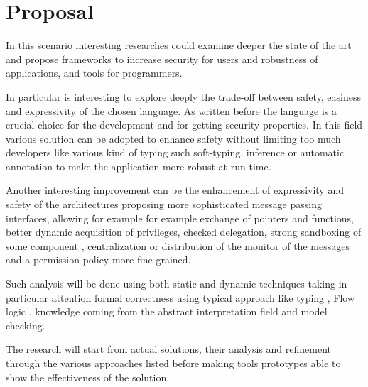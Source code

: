 \documentclass[10pt,a4paper,draft]{article}
\begin{document}
\section*{Proposal}
In this scenario interesting researches could examine deeper the state of the art and propose frameworks to increase security for users and robustness of applications, and tools for programmers.

In particular is interesting to explore deeply the trade-off between safety, easiness and expressivity of the chosen language. As written before the language is a crucial choice for the development and for getting security properties. In this field various solution can be adopted to enhance safety without limiting too much developers like various kind of typing such soft-typing, inference or automatic annotation to make the application more robust at run-time.

Another interesting improvement can be the enhancement of expressivity and safety of the architectures proposing more sophisticated message passing interfaces, allowing for example for example exchange of pointers and functions, better dynamic acquisition of privileges, checked delegation, strong sandboxing of some component \cite{PriviSep}, centralization or distribution of the monitor of the messages and a permission policy more fine-grained.

Such analysis will be done using both static and dynamic techniques taking in particular attention formal correctness using typical approach like typing \cite{Strobe}, Flow logic \cite{FlowLogic,CarmelFlowLogicFormalization,PrincipleProgramAnalysis}, knowledge coming from the abstract interpretation field \cite{StringAbstraction,LambdaJSMightVanHorn} and model checking.

The research will start from actual solutions, their analysis and refinement through the various approaches listed before making tools prototypes able to show the effectiveness of the solution.



\end{document}
